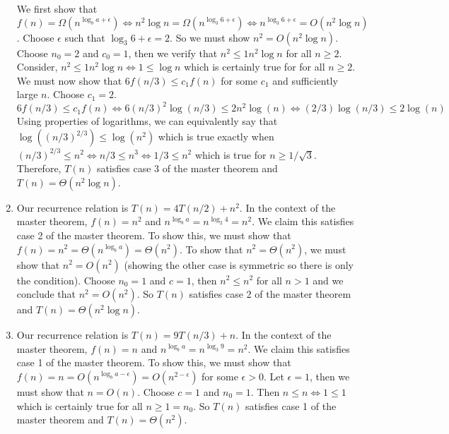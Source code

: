 \documentclass{article}
\begin{document}
\begin{enumerate}
    We first show that $f(n) = \Omega (n^{\log_b a + \epsilon}) \iff n^2 \log n = \Omega (n^{\log_3 6 + \epsilon}) \iff n^{\log_3 6 + \epsilon} = O(n^2 \log n)$.
    Choose $\epsilon$ such that $\log_3 6 + \epsilon = 2$.
    So we must show $n^2 = O(n^2 \log n)$.
    Choose $n_0 = 2$ and $c_0 = 1$, then we verify that $n^2 \leq 1 n^2 \log n$ for all $n \geq 2$.
    Consider, $ n^2 \leq 1 n^2 \log n \iff 1 \leq \log n $ which is certainly true for for all $n \geq 2$. \parspace
    We must now show that $6 f(n/3) \leq c_1 f(n)$ for some $c_1$ and sufficiently large $n$.
    Choose $c_1 = 2$.
    $$ 6 f(n/3) \leq c_1 f(n) \iff 6 (n/3)^2 \log(n/3) \leq 2 n^2 \log(n) \iff (2/3) \log (n/3) \leq 2 \log (n) $$
    Using properties of logarithms, we can equivalently say that $\log ((n/3)^{2/3}) \leq \log (n^2)$ which is true exactly when $(n/3)^{2/3} \leq n^2 \iff n/3 \leq n^3 \iff 1/3 \leq n^2$ which is true for $n \geq 1/\sqrt{3}$. \parspace
    Therefore, $T(n)$ satisfies case 3 of the master theorem and $T(n) = \Theta (n^2 \log n)$.
    \item Our recurrence relation is $T(n) = 4T(n/2) + n^2$.
    In the context of the master theorem, $f(n) = n^2$ and $n^{\log_b a} = n^{\log_2 4} = n^2$.
    We claim this satisfies case 2 of the master theorem.
    To show this, we must show that $f(n) = n^2 = \Theta (n^{\log_b a}) = \Theta (n^2)$. \parspace
    To show that $n^2 = \Theta (n^2)$, we must show that $n^2 = O(n^2)$ (showing the other case is symmetric so there is only the condition).
    Choose $n_0 = 1$ and $c = 1$, then $n^2 \leq n^2$ for all $n > 1$ and we conclude that $n^2 = O(n^2)$. \parspace
    So $T(n)$ satisfies case 2 of the master theorem and $T(n) = \Theta (n^2 \log n)$.
    \item Our recurrence relation is $T(n) = 9T(n/3) + n$.
    In the context of the master theorem, $f(n) = n$ and $n^{\log_b a} = n^{\log_3 9} = n^2$.
    We claim this satisfies case 1 of the master theorem.
    To show this, we must show that $f(n) = n = O(n^{\log_b a - \epsilon}) = O(n^{2 - \epsilon})$ for some $\epsilon > 0$. \parspace
    Let $\epsilon = 1$, then we must show that $n = O(n)$.
    Choose $c = 1$ and $n_0 = 1$.
    Then $n \leq n \iff 1 \leq 1$ which is certainly true for all $n \geq 1 = n_0$.
    So $T(n)$ satisfies case 1 of the master theorem and $T(n) = \Theta (n^2)$.
\end{enumerate}


\nextprob
{}
\end{document}
